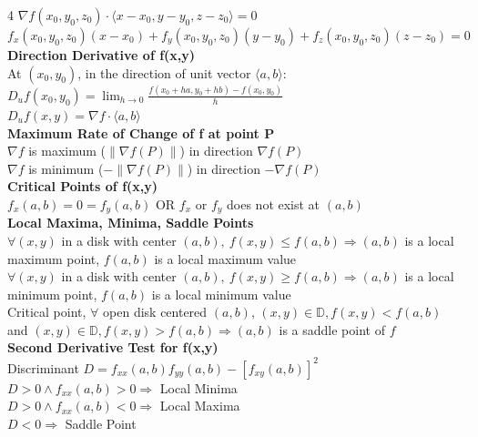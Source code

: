 \documentclass[10pt,landscape,a4paper]{article}
\begin{document}
\begin{multicols*}{4}
$\nabla f(x_0,y_0,z_0)\cdot\langle x-x_0,y-y_0,z-z_0\rangle=0$\\
$f_x(x_0,y_0,z_0)(x-x_0)+f_y(x_0,y_0,z_0)(y-y_0)+f_z(x_0,y_0,z_0)(z-z_0)=0$\\
\textbf{Direction Derivative of f(x,y)}\\
At $(x_0,y_0)$, in the direction of unit vector $\langle a,b\rangle$:\\
$D_uf(x_0,y_0)=\lim_{h\to0}\frac{f(x_0+ha,y_0+hb)-f(x_0,y_0)}{h}$\\
$D_uf(x,y)=\nabla f\cdot\langle a,b\rangle$\\
\textbf{Maximum Rate of Change of f at point P}\\
$\nabla f$ is maximum ($\|\nabla f(P)\|$) in direction $\nabla f(P)$\\
$\nabla f$ is minimum ($-\|\nabla f(P)\|$) in direction $-\nabla f(P)$\\
\textbf{Critical Points of f(x,y)}\\
$f_x(a,b)=0=f_y(a,b)$ OR $f_x$ or $f_y$ does not exist at $(a,b)$\\
\textbf{Local Maxima, Minima, Saddle Points}\\
$\forall(x,y)$ in a disk with center $(a,b),\ f(x,y)\le f(a,b)\Rightarrow(a,b)$ is a local maximum point, $f(a,b)$ is a local maximum value\\
$\forall(x,y)$ in a disk with center $(a,b),\ f(x,y)\ge f(a,b)\Rightarrow(a,b)$ is a local minimum point, $f(a,b)$ is a local minimum value\\
Critical point, $\forall$ open disk centered $(a,b)$, $(x,y)\in\mathbb{D}, f(x,y)<f(a,b)$ and $(x,y)\in\mathbb{D}, f(x,y)>f(a,b)\Rightarrow(a,b)$ is a saddle point of $f$\\
\textbf{Second Derivative Test for f(x,y)}\\
Discriminant $D=f_{xx}(a,b)f_{yy}(a,b)-[f_{xy}(a,b)]^2$\\
$D>0\wedge f_{xx}(a,b)>0\Rightarrow$ Local Minima\\
$D>0\wedge f_{xx}(a,b)<0\Rightarrow$ Local Maxima\\
$D<0\Rightarrow$ Saddle Point

\end{multicols*}
\end{document}
